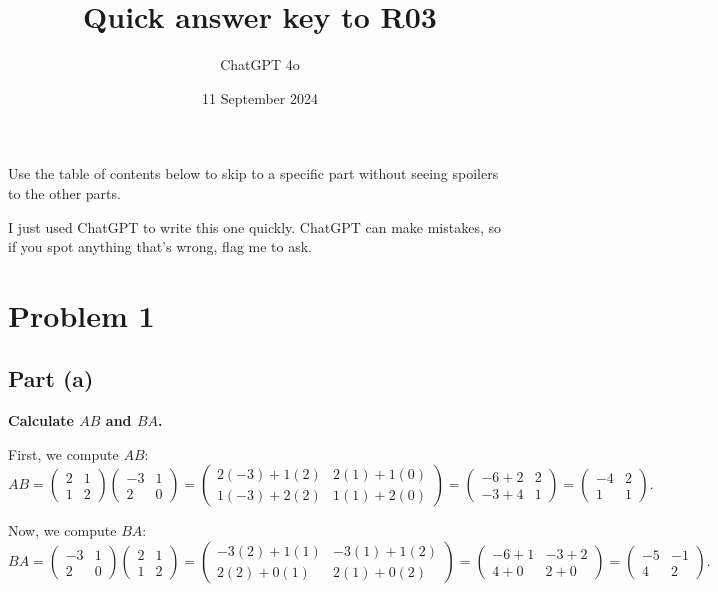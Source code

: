 \documentclass[11pt]{article}
\begin{document}
\title{Quick answer key to R03}
\author{ChatGPT 4o}
\date{11 September 2024}
\maketitle

Use the table of contents below to skip to a specific part
without seeing spoilers to the other parts.

I just used ChatGPT to write this one quickly.
ChatGPT can make mistakes, so if you spot anything that's wrong, flag me to ask.

\tableofcontents

\newpage

\section{Problem 1}
\subsection{Part (a)}
\textbf{Calculate $AB$ and $BA$.}

First, we compute $AB$:
\[
AB = \begin{pmatrix} 2 & 1 \\ 1 & 2 \end{pmatrix} \begin{pmatrix} -3 & 1 \\ 2 & 0 \end{pmatrix}
= \begin{pmatrix} 2(-3) + 1(2) & 2(1) + 1(0) \\ 1(-3) + 2(2) & 1(1) + 2(0) \end{pmatrix}
= \begin{pmatrix} -6 + 2 & 2 \\ -3 + 4 & 1 \end{pmatrix}
= \begin{pmatrix} -4 & 2 \\ 1 & 1 \end{pmatrix}.
\]

Now, we compute $BA$:
\[
BA = \begin{pmatrix} -3 & 1 \\ 2 & 0 \end{pmatrix} \begin{pmatrix} 2 & 1 \\ 1 & 2 \end{pmatrix}
= \begin{pmatrix} -3(2) + 1(1) & -3(1) + 1(2) \\ 2(2) + 0(1) & 2(1) + 0(2) \end{pmatrix}
= \begin{pmatrix} -6 + 1 & -3 + 2 \\ 4 + 0 & 2 + 0 \end{pmatrix}
= \begin{pmatrix} -5 & -1 \\ 4 & 2 \end{pmatrix}.
\]
\end{document}

